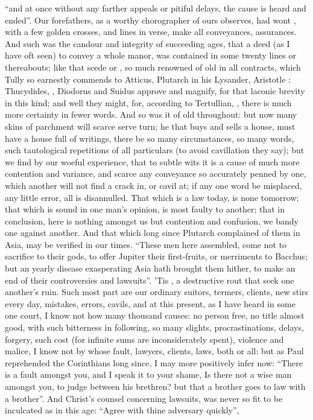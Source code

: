 \enquote{and at once without any farther appeals or pitiful delays, the cause is heard
and ended}. Our forefathers, as a worthy chorographer of
ours observes, had wont , with a few golden
crosses, and lines in verse, make all conveyances, assurances. And such was the
candour and integrity of succeeding ages, that a deed (as I have oft seen) to
convey a whole manor, was  contained in some twenty lines or
thereabouts; like that scede or , so much renowned of old
in all contracts, which Tully so earnestly commends to
Atticus, Plutarch in his Lysander, Aristotle :
Thucydides, , Diodorus and
Suidus approve and magnify, for that laconic brevity in this kind; and well
they might, for, according to Tertullian, , there is much more certainty in fewer words. And so was it of old
throughout: but now many skins of parchment will scarce serve turn; he that
buys and sells a house, must have a house full of writings, there be so many
circumstances, so many words, such tautological repetitions of all particulars
(to avoid cavillation they say); but we find by our woeful experience, that to
subtle wits it is a cause of much more contention and variance, and scarce any
conveyance so accurately penned by one, which another will not find a crack in,
or cavil at; if any one word be misplaced, any little error, all is
disannulled. That which is a law today, is none tomorrow; that which is sound
in one man's opinion, is most faulty to another; that in conclusion, here is
nothing amongst us but contention and confusion, we bandy one against another.
And that which long since Plutarch complained of them in
Asia, may be verified in our times. \enquote{These men here assembled, come not to
sacrifice to their gods, to offer Jupiter their first-fruits, or merriments to
Bacchus; but an yearly disease exasperating Asia hath brought them hither, to
make an end of their controversies and lawsuits}. 'Tis , a destructive rout that seek one another's ruin. Such most part
are our ordinary suitors, termers, clients, new stirs every day, mistakes,
errors, cavils, and at this present, as I have heard in some one court, I know
not how many thousand causes: no person free, no title almost good, with such
bitterness in following, so many slights, procrastinations, delays, forgery,
such cost (for infinite sums are inconsiderately spent), violence and malice, I
know not by whose fault, lawyers, clients, laws, both or all: but as Paul
reprehended the Corinthians long since, I may more
positively infer now: \enquote{There is a fault amongst you, and I speak it to your
shame, Is there not a wise man amongst you, to judge
between his brethren? but that a brother goes to law with a brother}. And
Christ's counsel concerning lawsuits, was never so fit to
be inculcated as in this age: \enquote{Agree with thine adversary
quickly}, \etc{} 

